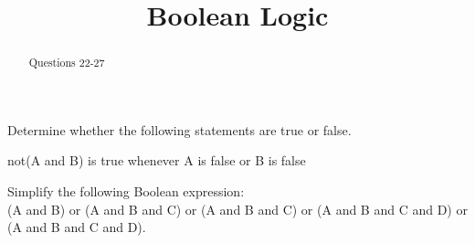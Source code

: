 \documentclass{ximera}
\title{Boolean Logic}
\begin{document}
\begin{abstract}
  Questions 22-27
\end{abstract}
\maketitle


\begin{question}
Determine whether the following statements are true or false.

\begin{question}
not(A and B) is true whenever A is false or B is false
\begin{multiple-choice}
\end{multiple-choice}
\end{question}

\begin{question}
\begin{multiple-choice}
\end{multiple-choice}
\end{question}

\begin{question}
\begin{multiple-choice}
\end{multiple-choice}
\end{question}

\begin{question}
\begin{multiple-choice}
\end{multiple-choice}
\end{question}

\end{question}

\begin{question}
Simplify the following Boolean expression: \\
(A and B) or (A and B and C) or (A and B and C) or (A and B and C and D) or (A and B and C and D).
\begin{solution}
\begin{multiple-choice}
\end{multiple-choice}
\end{solution}
\end{question}
\end{document}

